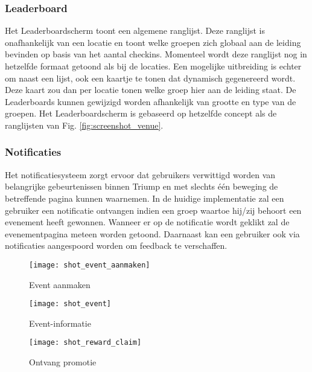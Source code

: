 \subsubsection{Leaderboard}%
Het Leaderboardscherm toont een algemene ranglijst. Deze ranglijst is onafhankelijk van een locatie en toont welke groepen zich globaal aan de leiding bevinden op basis van het aantal checkins. Momenteel wordt deze ranglijst nog in hetzelfde formaat getoond als bij de locaties. Een mogelijke uitbreiding is echter om naast een lijst, ook een kaartje te tonen dat dynamisch gegenereerd wordt. Deze kaart zou dan per locatie tonen welke groep hier aan de leiding staat. De Leaderboards kunnen gewijzigd worden afhankelijk van grootte en type van de groepen. Het Leaderboardscherm is gebaseerd op hetzelfde concept als de ranglijsten van Fig. \ref{fig:screenshot_venue}.
\subsubsection{Notificaties} %
Het notificatiesysteem zorgt ervoor dat gebruikers verwittigd worden van belangrijke gebeurtenissen binnen Triump en met slechts één beweging de betreffende pagina kunnen waarnemen. In de huidige implementatie zal een gebruiker een notificatie ontvangen indien een groep waartoe hij/zij behoort een evenement heeft gewonnen. Wanneer er op de notificatie wordt geklikt zal de evenementpagina meteen worden getoond. Daarnaast kan een gebruiker ook via notificaties aangespoord worden om feedback te verschaffen.   

\begin{figure}[ht]

\begin{minipage}[b]{0.25\linewidth}
\centering
\texttt{[image: shot\_event\_aanmaken]}
\caption{Event aanmaken}
\label{fig:shot_event_aanmaken}
\end{minipage}
\hspace{1.8cm}
\begin{minipage}[b]{0.25\linewidth}
\centering
\texttt{[image: shot\_event]}
\caption{Event-informatie}
\label{fig:shot_event}
\end{minipage}
\hspace{1.8cm}
\begin{minipage}[b]{0.25\linewidth}
\centering
\texttt{[image: shot\_reward\_claim]}
\caption{Ontvang promotie}
\label{fig:shot_reward_claim}
\end{minipage}
\end{figure}
\clearpage

